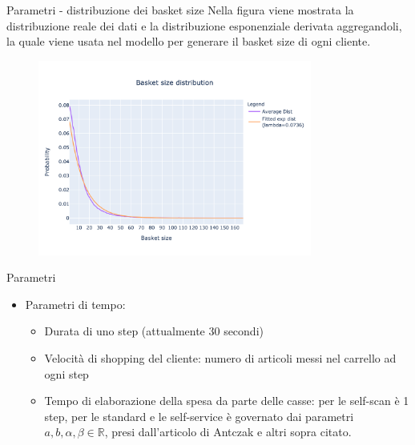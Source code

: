 \begin{frame}{Parametri - distribuzione dei basket size}
	Nella figura viene mostrata la distribuzione reale dei dati e la distribuzione esponenziale derivata aggregandoli, la quale viene usata nel modello per generare il basket size di ogni cliente.
	\begin{figure}[H]
		\centering
		\includegraphics[width=9cm]{"../report/images/basket_size_fitted.png"}
		\label{fig:dist_basket_size}
	\end{figure}
\end{frame}

\begin{frame}{Parametri}
	\begin{itemize}
		\item Parametri di tempo:
		\begin{itemize}
			\item Durata di uno step (attualmente 30 secondi)
			\item Velocità di shopping del cliente: numero di articoli messi nel carrello ad ogni step
			\item Tempo di elaborazione della spesa da parte delle casse: per le self-scan è 1 step, per le standard e le self-service è governato dai parametri $a, b, \alpha, \beta \in \mathbb{R}$, presi dall'articolo di Antczak e altri sopra citato.
		\end{itemize}
	\end{itemize}
\end{frame}